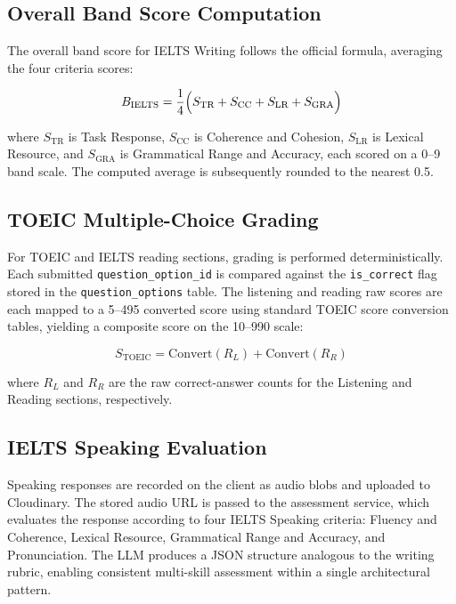 \documentclass[conference]{IEEEtran}
\begin{document}
\subsection{Overall Band Score Computation}
The overall band score for IELTS Writing follows the official formula, averaging the four criteria scores:

\begin{equation}
B_{\text{IELTS}} = \frac{1}{4}
\Bigl(
  S_{\text{TR}} + S_{\text{CC}} + S_{\text{LR}} + S_{\text{GRA}}
\Bigr)
\label{eq:ielts}
\end{equation}

where $S_{\text{TR}}$ is Task Response, $S_{\text{CC}}$ is Coherence and Cohesion, $S_{\text{LR}}$ is Lexical Resource, and $S_{\text{GRA}}$ is Grammatical Range and Accuracy, each scored on a 0--9 band scale. The computed average is subsequently rounded to the nearest 0.5.

\subsection{TOEIC Multiple-Choice Grading}
For TOEIC and IELTS reading sections, grading is performed deterministically. Each submitted \texttt{question\_option\_id} is compared against the \texttt{is\_correct} flag stored in the \texttt{question\_options} table. The listening and reading raw scores are each mapped to a 5--495 converted score using standard TOEIC score conversion tables, yielding a composite score on the 10--990 scale:

\begin{equation}
S_{\text{TOEIC}} = \text{Convert}(R_L) + \text{Convert}(R_R)
\label{eq:toeic}
\end{equation}

where $R_L$ and $R_R$ are the raw correct-answer counts for the Listening and Reading sections, respectively.

\subsection{IELTS Speaking Evaluation}
Speaking responses are recorded on the client as audio blobs and uploaded to Cloudinary. The stored audio URL is passed to the assessment service, which evaluates the response according to four IELTS Speaking criteria: Fluency and Coherence, Lexical Resource, Grammatical Range and Accuracy, and Pronunciation. The LLM produces a JSON structure analogous to the writing rubric, enabling consistent multi-skill assessment within a single architectural pattern.
\end{document}
